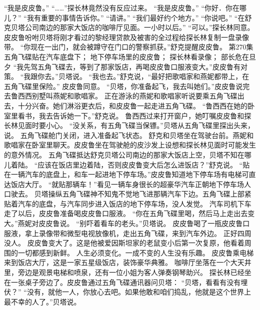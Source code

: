 \documentclass[a4paper,12pt,UTF8,twoside]{ctexbook}
\begin{document}
        “我是皮皮鲁。”  
        “……”探长林竟然没有反应过来。  
        “我是皮皮鲁。”  
        “你好．你在哪儿？”  
        “我有重要的事情告诉你。”  
        “请讲。”  
        “我们最好约个地方。”  
        “你说吧。”  
        “在舒克贝塔公司南边的那家大饭店的咖啡厅见面。一小时以后。”  
        “可以。”探长林同意。  
        皮皮鲁吩咐贝塔将刚才看过的黎经理贷款及被害的全过程给探长林复制一盘录像带。  
        “你现在一出门，就会被蹲守在门口的警察抓获。”舒克提醒皮皮鲁。          第270集  
        五角飞碟贴在汽车底盘下；  
        地下停车场里的皮皮鲁；  
        探长林看录像；  
        部长危在旦夕    
        “我先驾五角飞碟去，等到了那家饭店，再喝皮皮鲁口服液变大。”皮皮鲁有对策。  
        “我跟你去。”贝塔说。  
        “我也去。”舒克说，“最好把歌唱家和燕妮都带上，在五角飞碟里保险。”  
        皮皮鲁同意。  
        “贝塔，你准备起飞，我去叫她们。”皮皮鲁说完去鲁西西别墅叫燕妮和歌唱家。  
        正在游泳的燕妮和歌唱家听说要乘五角飞碟出去，十分兴奋。她们淋浴更衣后，和皮皮鲁一起走进五角飞碟。        
        “鲁西西在她的卧室里看书，我去告诉她一下。”舒克说。  
        鲁西西过来打开窗户，她叮嘱皮皮鲁和探长林见面时要小心。  
        “没关系，有五角飞碟当保镖。”贝塔从五角飞碟里探出头来，说。  
        五角飞碟舱门关闭，进入准备起飞状态。  
        舒克和贝塔坐在驾驶台前。燕妮和歌唱家在卧室里聊天。皮皮鲁坐在驾驶舱的皮沙发上设想和探长林见面时可能发生的意外情况。  
        五角飞碟抵达舒克贝塔公司南边的那家大饭店上空，贝塔不知在哪儿着陆。  
        “应该在饭店里边着陆，否则皮皮鲁变大后怎么进饭店？”舒克说。  
        “贴在一辆汽车的底盘上，和车一起进地下停车场。”皮皮鲁知道地下停车场有电梯可直达饭店大厅。  
        “就贴那辆车！”看见一辆车身很长的超豪华汽车正朝地下停车场人口驶去。  
        贝塔操纵五角飞碟神不知鬼不觉地飞进那辆汽车下边。五角飞碟上部紧贴着汽车的底盘，与汽车同步进入饭店的地下停车场，没人发觉。  
        汽车司机下车走了以后，皮皮鲁准备喝皮皮鲁口服液。        
        “你在五角飞碟里喝，然后马上走出去变大。”燕妮对皮皮鲁说。  
        “别吓着看车的老头。”贝塔说。  
        皮皮鲁喝了一瓶皮皮鲁口服液，拿上录像带和微型电视放像机，走出五角飞碟，来到汽车外边。  
        正好四周没人。  
        皮皮鲁变大了。这是他被爱因斯坦家的老鼠变小后第一次复原，他看着周围的一切都感到新鲜。  
        人生必须变化。一成不变的人生没有乐趣。  
        皮皮鲁乘电梯来到饭店大厅，这是一家五星级饭店，装饰豪华典雅。  
        咖啡厅坐落在一个大天井里，旁边是观景电梯和喷泉，还有一位小姐为客人弹奏钢琴助兴。  
        探长林已经坐在一张桌子旁边了。皮皮鲁通过五角飞碟通讯器问贝塔：  
        “贝塔，看看有没有埋伏？”  
        “没有，就他一人，你放心去吧。如果他敢和咱们捣乱，他就是这个世界上最不幸的人了。”贝塔说。  
\end{document}
